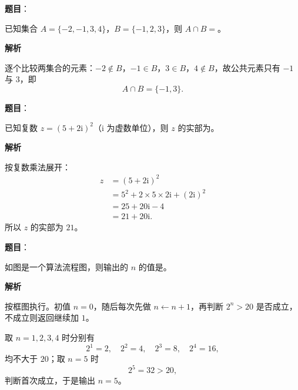

\begin{answer}

\textbf{题目}：

已知集合 $A=\{-2,-1,3,4\}$，$B=\{-1,2,3\}$，则 $A\cap B=$\gkblank{}。

\textbf{解析}

逐个比较两集合的元素：$-2\notin B$，$-1\in B$，$3\in B$，$4\notin B$，故公共元素只有 $-1$ 与 $3$，即
\nopagebreak[4]
\[A\cap B=\{-1,3\}.\]


\end{answer}
\begin{answer}

\textbf{题目}：

已知复数 $z=(5+2\mathrm i)^2$（$\mathrm i$ 为虚数单位），则 $z$ 的实部为\gkblank{}。

\textbf{解析}

按复数乘法展开：
\nopagebreak[4]
\[\begin{aligned}
z&=(5+2\mathrm i)^2\\
&=5^2+2\times5\times2\mathrm i+(2\mathrm i)^2\\
&=25+20\mathrm i-4\\
&=21+20\mathrm i.
\end{aligned}\]
所以 $z$ 的实部为 $21$。


\end{answer}
\begin{answer}

\textbf{题目}：

如图是一个算法流程图，则输出的 $n$ 的值是\gkblank{}。
\nopagebreak[4]
\begin{center}\end{center}
\nopagebreak[4]
\textbf{解析}

按框图执行。初值 $n=0$，随后每次先做 $n\leftarrow n+1$，再判断 $2^n>20$ 是否成立，不成立则返回继续加 $1$。

取 $n=1,2,3,4$ 时分别有
\nopagebreak[4]
\[2^1=2,\quad 2^2=4,\quad 2^3=8,\quad 2^4=16,\]
均不大于 $20$；取 $n=5$ 时
\nopagebreak[4]
\[2^5=32>20,\]
判断首次成立，于是输出 $n=5$。


\end{answer}
